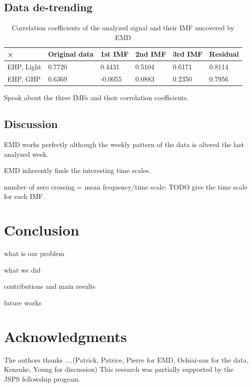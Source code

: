 \documentclass[letter,10pt]{sig-alternate-10pt}
\begin{document}
\subsection{Data de-trending}
\begin{table}
\begin{center}
\begin{tabular}{|l|l|l|l|l|l|}
\hline
× & Original data & 1st IMF & 2nd IMF & 3rd IMF & Residual\\ \hline
EHP, Light & 0.7720 & 0.4431 & 0.5104 & 0.6171 & 0.8114\\ \hline
EHP, GHP & 0.6369 & -0.0055 & 0.0883 & 0.2350 & 0.7956\\ \hline
\end{tabular}

\caption{Correlation coefficients of the analyzed signal and their IMF uncovered by EMD}

\end{center}
\end{table}

Speak about the three IMFs and their correlation coefficients.

\subsection{Discussion}
EMD works perfectly although the weekly pattern of the data is altered the last analyzed week.

EMD inherently finds the interesting time scales.

number of zero crossing = mean frequency/time scale:
  TODO give the time scale for each IMF.


\section{Conclusion}
what is our problem

what we did

contributions and main results

future works

\section*{Acknowledgments}
The authors thanks ....(Patrick, Patrice, Pierre for EMD, Ochiai-san for the data, Kensuke, Young for discussion)
This research was partially supported by the JSPS fellowship program.



\end{document}
